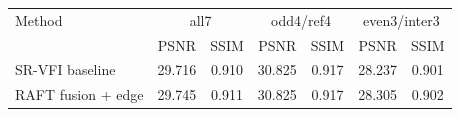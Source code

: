 \begin{tabular}{lcccccc}
\toprule
Method & \multicolumn{2}{c}{all7} & \multicolumn{2}{c}{odd4/ref4} & \multicolumn{2}{c}{even3/inter3} \\
 & PSNR & SSIM & PSNR & SSIM & PSNR & SSIM \\
\midrule
SR-VFI baseline & 29.716 & 0.910 & 30.825 & 0.917 & 28.237 & 0.901 \\
RAFT fusion + edge & 29.745 & 0.911 & 30.825 & 0.917 & 28.305 & 0.902 \\
\bottomrule
\end{tabular}
